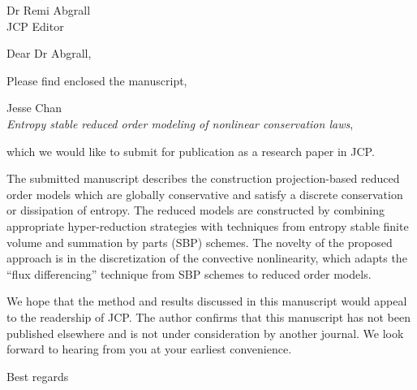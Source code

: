 \documentclass{letter}
\begin{document}
\begin{letter}{Dr Remi Abgrall\\JCP Editor}


\opening{Dear Dr Abgrall,}

Please find enclosed the manuscript, 
\begin{center}
Jesse Chan\\
\textit{Entropy stable reduced order modeling of nonlinear conservation laws},
\end{center}
which we would like to submit for publication as a research paper in JCP.  

The submitted manuscript describes the construction projection-based reduced order models which are globally conservative and satisfy a discrete conservation or dissipation of entropy.  The reduced models are constructed by combining appropriate hyper-reduction strategies with techniques from entropy stable finite volume and summation by parts (SBP) schemes.  The novelty of the proposed approach is in the discretization of the convective nonlinearity, which adapts the ``flux differencing'' technique from SBP schemes to reduced order models.  

We hope that the method and results discussed in this manuscript would appeal to the readership of JCP.  The author confirms that this manuscript has not been published elsewhere and is not under consideration by another journal.  We look forward to hearing from you at your earliest convenience.  

\closing{Best regards}

\end{letter}
\end{document}
